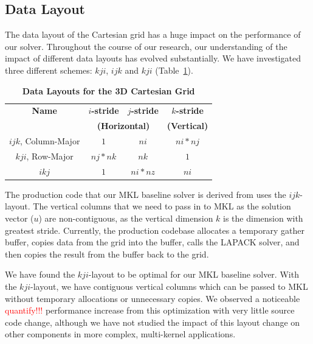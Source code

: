 \documentclass{sig-alternate-05-2015}
\newcommand{\fix}[1]{\textcolor{red}{#1}}
\begin{document}
\subsection{Data Layout}
\label{sec:implementation:data_layout}

The data layout of the Cartesian grid has a huge impact on the performance
  of our solver.
Throughout the course of our research, our understanding of the impact of
  different data layouts has evolved substantially.
We have investigated three different schemes: \(kji\), \(ijk\) and \(kji\)
  (Table~\ref{tab:implementation:data_layout:layouts}).

\begin{table}[h]
\centering
\caption{\textbf{Data Layouts for the 3D Cartesian Grid}}
\begin{tabular}[t]{|c|c|c|c|} \hline
\textbf{Name}         & \textbf{\(i\)-stride} & \textbf{\(j\)-stride} & \textbf{\(k\)-stride}   \\\cline{2-3}
                      & \multicolumn{2}{c|}{\textbf{(Horizontal)}}                 & \textbf{(Vertical)} \\ \hline
\(ijk\), Column-Major & \(1\)             & \(ni\)            & \(ni * nj\)         \\ \hline
\(kji\), Row-Major    & \(nj * nk\)       & \(nk\)            & \(1\)               \\ \hline
\(ikj\)               & \(1\)             & \(ni * nz\)       & \(ni\)              \\ \hline
\end{tabular}
\label{tab:implementation:data_layout:layouts}
\end{table}

The production code that our MKL baseline solver is derived from uses the
  \(ijk\)-layout.
The vertical columns that we need to pass in to MKL as the solution vector
  (\(u\)) are non-contiguous, as the vertical dimension \(k\) is the dimension
  with greatest stride.
Currently, the production codebase allocates a temporary gather buffer, copies
  data from the grid into the buffer, calls the LAPACK solver, and then copies
  the result from the buffer back to the grid.

We have found the \(kji\)-layout to be optimal for our MKL baseline solver.
With the \(kji\)-layout, we have contiguous vertical columns which can be
  passed to MKL without temporary allocations or unnecessary copies.
We observed a noticeable \fix{quantify!!!} performance increase from this optimization with very
  little source code change, although we have not studied the impact of this
  layout change on other components in more complex, multi-kernel applications.
\end{document}
